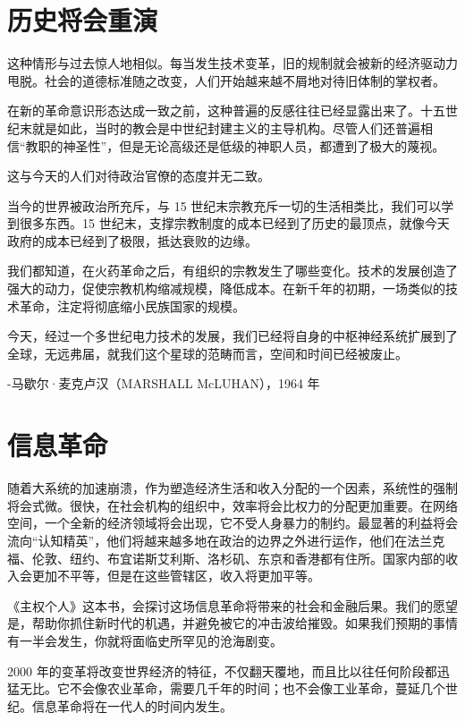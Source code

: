 \section{历史将会重演}
这种情形与过去惊人地相似。每当发生技术变革，旧的规制就会被新的经济驱动力甩脱。社会的道德标准随之改变，人们开始越来越不屑地对待旧体制的掌权者。


在新的革命意识形态达成一致之前，这种普遍的反感往往已经显露出来了。十五世纪末就是如此，当时的教会是中世纪封建主义的主导机构。尽管人们还普遍相信“教职的神圣性”，但是无论高级还是低级的神职人员，都遭到了极大的蔑视。


这与今天的人们对待政治官僚的态度并无二致。


当今的世界被政治所充斥，与 15 世纪末宗教充斥一切的生活相类比，我们可以学到很多东西。15 世纪末，支撑宗教制度的成本已经到了历史的最顶点，就像今天政府的成本已经到了极限，抵达衰败的边缘。


我们都知道，在火药革命之后，有组织的宗教发生了哪些变化。技术的发展创造了强大的动力，促使宗教机构缩减规模，降低成本。在新千年的初期，一场类似的技术革命，注定将彻底缩小民族国家的规模。



\begin{tcolorbox}
今天，经过一个多世纪电力技术的发展，我们已经将自身的中枢神经系统扩展到了全球，无远弗届，就我们这个星球的范畴而言，空间和时间已经被废止。
\begin{flushright}
-马歇尔·麦克卢汉（MARSHALL McLUHAN），1964 年
\end{flushright}
\end{tcolorbox}

\section{信息革命}
随着大系统的加速崩溃，作为塑造经济生活和收入分配的一个因素，系统性的强制将会式微。很快，在社会机构的组织中，效率将会比权力的分配更加重要。在网络空间，一个全新的经济领域将会出现，它不受人身暴力的制约。最显著的利益将会流向“认知精英”，他们将越来越多地在政治的边界之外进行运作，他们在法兰克福、伦敦、纽约、布宜诺斯艾利斯、洛杉矶、东京和香港都有住所。国家内部的收入会更加不平等，但是在这些管辖区，收入将更加平等。

《主权个人》这本书，会探讨这场信息革命将带来的社会和金融后果。我们的愿望是，帮助你抓住新时代的机遇，并避免被它的冲击波给摧毁。如果我们预期的事情有一半会发生，你就将面临史所罕见的沧海剧变。


2000 年的变革将改变世界经济的特征，不仅翻天覆地，而且比以往任何阶段都迅猛无比。它不会像农业革命，需要几千年的时间；也不会像工业革命，蔓延几个世纪。信息革命将在一代人的时间内发生。

